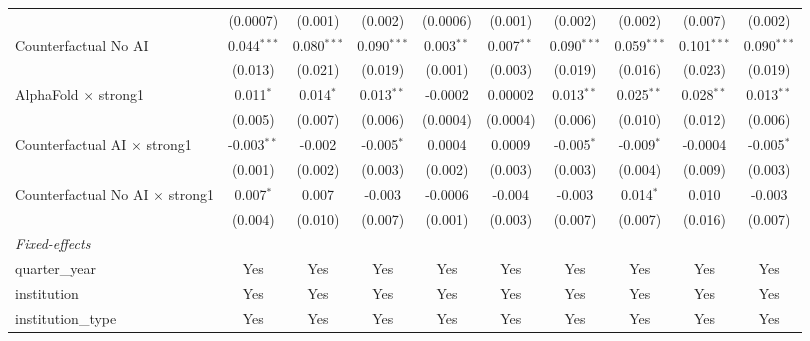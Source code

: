 \begin{tabular}{lccccccccc}
                                          & (0.0007)      & (0.001)       & (0.002)       & (0.0006)     & (0.001)      & (0.002)       & (0.002)       & (0.007)       & (0.002)\\   
   Counterfactual No AI                   & 0.044$^{***}$ & 0.080$^{***}$ & 0.090$^{***}$ & 0.003$^{**}$ & 0.007$^{**}$ & 0.090$^{***}$ & 0.059$^{***}$ & 0.101$^{***}$ & 0.090$^{***}$\\   
                                          & (0.013)       & (0.021)       & (0.019)       & (0.001)      & (0.003)      & (0.019)       & (0.016)       & (0.023)       & (0.019)\\   
   AlphaFold $\times$ strong1             & 0.011$^{*}$   & 0.014$^{*}$   & 0.013$^{**}$  & -0.0002      & 0.00002      & 0.013$^{**}$  & 0.025$^{**}$  & 0.028$^{**}$  & 0.013$^{**}$\\   
                                          & (0.005)       & (0.007)       & (0.006)       & (0.0004)     & (0.0004)     & (0.006)       & (0.010)       & (0.012)       & (0.006)\\   
   Counterfactual AI $\times$ strong1     & -0.003$^{**}$ & -0.002        & -0.005$^{*}$  & 0.0004       & 0.0009       & -0.005$^{*}$  & -0.009$^{*}$  & -0.0004       & -0.005$^{*}$\\   
                                          & (0.001)       & (0.002)       & (0.003)       & (0.002)      & (0.003)      & (0.003)       & (0.004)       & (0.009)       & (0.003)\\   
   Counterfactual No AI $\times$ strong1  & 0.007$^{*}$   & 0.007         & -0.003        & -0.0006      & -0.004       & -0.003        & 0.014$^{*}$   & 0.010         & -0.003\\   
                                          & (0.004)       & (0.010)       & (0.007)       & (0.001)      & (0.003)      & (0.007)       & (0.007)       & (0.016)       & (0.007)\\   
   \midrule
   \emph{Fixed-effects}\\
   quarter\_year                          & Yes           & Yes           & Yes           & Yes          & Yes          & Yes           & Yes           & Yes           & Yes\\  
   institution                            & Yes           & Yes           & Yes           & Yes          & Yes          & Yes           & Yes           & Yes           & Yes\\  
   institution\_type                      & Yes           & Yes           & Yes           & Yes          & Yes          & Yes           & Yes           & Yes           & Yes\\  

\end{tabular}
